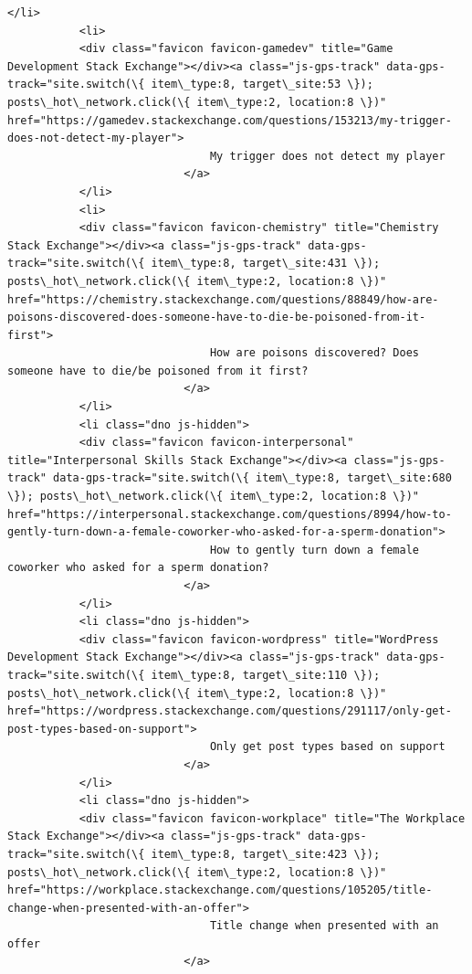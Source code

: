 \documentclass[11pt]{article}
\begin{document}
\begin{Verbatim}[commandchars=\\\{\}]
           </li>
           <li>
           <div class="favicon favicon-gamedev" title="Game Development Stack Exchange"></div><a class="js-gps-track" data-gps-track="site.switch(\{ item\_type:8, target\_site:53 \}); posts\_hot\_network.click(\{ item\_type:2, location:8 \})" href="https://gamedev.stackexchange.com/questions/153213/my-trigger-does-not-detect-my-player">
                               My trigger does not detect my player
                           </a>
           </li>
           <li>
           <div class="favicon favicon-chemistry" title="Chemistry Stack Exchange"></div><a class="js-gps-track" data-gps-track="site.switch(\{ item\_type:8, target\_site:431 \}); posts\_hot\_network.click(\{ item\_type:2, location:8 \})" href="https://chemistry.stackexchange.com/questions/88849/how-are-poisons-discovered-does-someone-have-to-die-be-poisoned-from-it-first">
                               How are poisons discovered? Does someone have to die/be poisoned from it first?
                           </a>
           </li>
           <li class="dno js-hidden">
           <div class="favicon favicon-interpersonal" title="Interpersonal Skills Stack Exchange"></div><a class="js-gps-track" data-gps-track="site.switch(\{ item\_type:8, target\_site:680 \}); posts\_hot\_network.click(\{ item\_type:2, location:8 \})" href="https://interpersonal.stackexchange.com/questions/8994/how-to-gently-turn-down-a-female-coworker-who-asked-for-a-sperm-donation">
                               How to gently turn down a female coworker who asked for a sperm donation?
                           </a>
           </li>
           <li class="dno js-hidden">
           <div class="favicon favicon-wordpress" title="WordPress Development Stack Exchange"></div><a class="js-gps-track" data-gps-track="site.switch(\{ item\_type:8, target\_site:110 \}); posts\_hot\_network.click(\{ item\_type:2, location:8 \})" href="https://wordpress.stackexchange.com/questions/291117/only-get-post-types-based-on-support">
                               Only get post types based on support
                           </a>
           </li>
           <li class="dno js-hidden">
           <div class="favicon favicon-workplace" title="The Workplace Stack Exchange"></div><a class="js-gps-track" data-gps-track="site.switch(\{ item\_type:8, target\_site:423 \}); posts\_hot\_network.click(\{ item\_type:2, location:8 \})" href="https://workplace.stackexchange.com/questions/105205/title-change-when-presented-with-an-offer">
                               Title change when presented with an offer
                           </a>

\end{Verbatim}
\end{document}
